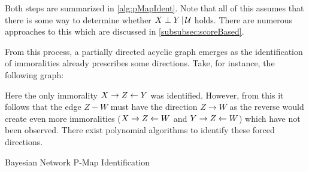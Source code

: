 			Both steps are summarized in \autoref{alg:pMapIdent}. Note that all of this assumes that there is some way to determine whether \( X \perp Y \,\vert\, \mathcal{U} \) holds. There are numerous approaches to this which are discussed in \autoref{subsubsec:scoreBased}.

			From this process, a partially directed acyclic graph emerges as the identification of immoralities already prescribes some directions. Take, for instance, the following graph:
			\begin{center}
			\end{center}
			Here the only immorality \( X \to Z \leftarrow Y \) was identified. However, from this it follows that the edge \( Z - W \) must have the direction \( Z \to W \) as the reverse would create even more immoralities (\( X \to Z \leftarrow W \) and \( Y \to Z \leftarrow W \)) which have not been observed. There exist polynomial algorithms to identify these forced directions.

			\begin{algorithm}
				\caption{Bayesian Network P-Map Identification}
				\label{alg:pMapIdent}
			\end{algorithm}

